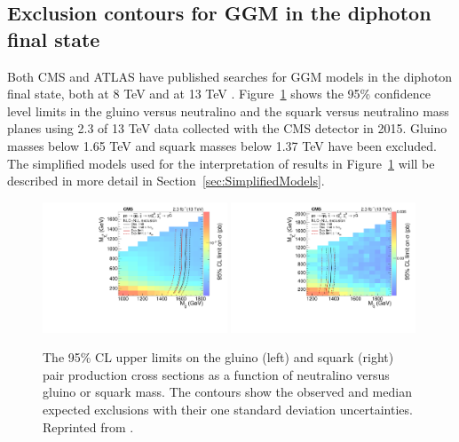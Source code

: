 \subsection{Exclusion contours for GGM in the diphoton final state}
\label{sec:GMSBlimits}
Both CMS and ATLAS have published searches for GGM models in the diphoton final state, both at 8 TeV \cite{Aad:2015hea,Khachatryan:2015exa} and at 13 TeV \cite{ATLAS:2016aa,CMS:2015_anal}. Figure~\ref{fig:Limits2015CMS} shows the 95\% confidence level limits in the gluino versus neutralino and the squark versus neutralino mass planes using 2.3 \fbinv of 13 TeV data collected with the CMS detector in 2015. 
Gluino masses below 1.65 TeV and squark masses below 1.37 TeV have been excluded.
The simplified models used for the interpretation of results in Figure~\ref{fig:Limits2015CMS} will be described in more detail in Section~\ref{sec:SimplifiedModels}.

\begin{figure}[h]
\begin{center}
\includegraphics[width=0.49\textwidth]{Figures/Theory/2015gg.pdf}
\includegraphics[width=0.49\textwidth]{Figures/Theory/2015qq.pdf}
\end{center}
    \caption{The 95\% CL upper limits on the gluino (left) and squark (right)
        pair production cross sections as a function of neutralino versus
	gluino or squark mass. The contours show the observed and median
        expected exclusions with their one
        standard deviation uncertainties. Reprinted from \cite{CMS:2015_anal}.}
    \label{fig:Limits2015CMS}
\end{figure}

